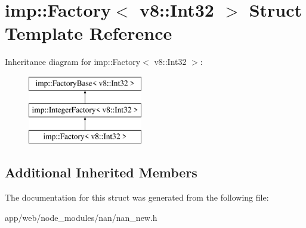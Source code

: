 \hypertarget{structimp_1_1_factory_3_01v8_1_1_int32_01_4}{}\section{imp\+:\+:Factory$<$ v8\+:\+:Int32 $>$ Struct Template Reference}
\label{structimp_1_1_factory_3_01v8_1_1_int32_01_4}
Inheritance diagram for imp\+:\+:Factory$<$ v8\+:\+:Int32 $>$\+:\begin{figure}[H]
\begin{center}
\leavevmode
\includegraphics[height=3.000000cm]{structimp_1_1_factory_3_01v8_1_1_int32_01_4}
\end{center}
\end{figure}
\subsection*{Additional Inherited Members}


The documentation for this struct was generated from the following file\+:\begin{DoxyCompactItemize}
\item 
app/web/node\+\_\+modules/nan/nan\+\_\+new.\+h\end{DoxyCompactItemize}
